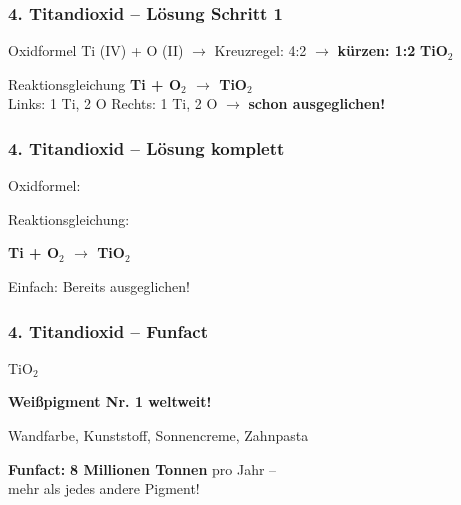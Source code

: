 \documentclass[aspectratio=169, 12pt]{beamer}
\newcommand{\lsg}[1]{\textcolor{loesung}{\textbf{#1}}}
\begin{document}
\begin{frame}
\frametitle{4. Titandioxid – Lösung Schritt 1}
\begin{block}{Oxidformel}
Ti (IV) + O (II) $\rightarrow$ Kreuzregel: 4:2 $\rightarrow$ \textbf{kürzen: 1:2} \hfill \lsg{TiO$_2$}
\end{block}
\vspace{0.3cm}
\begin{block}{Reaktionsgleichung}
\lsg{Ti + O$_2$ $\rightarrow$ TiO$_2$}\\[0.3cm]
Links: 1 Ti, 2 O \quad Rechts: 1 Ti, 2 O \quad $\rightarrow$ \textbf{schon ausgeglichen!}
\end{block}
\end{frame}

\begin{frame}
\frametitle{4. Titandioxid – Lösung komplett}
\begin{center}
\vspace{0.5cm}
{\large Oxidformel:} \quad {\Huge \lsg{TiO$_2$}}
\vspace{1cm}

{\large Reaktionsgleichung:}
\vspace{0.5cm}

{\Huge \lsg{Ti + O$_2$ $\rightarrow$ TiO$_2$}}
\vspace{0.5cm}

{\small Einfach: Bereits ausgeglichen! \checkmark}
\end{center}
\end{frame}

\begin{frame}
\frametitle{4. Titandioxid – Funfact}
\begin{center}
\vspace{0.3cm}
{\Huge \textcolor{chemie}{TiO$_2$}}
\vspace{0.8cm}

{\Large\textbf{Weißpigment Nr. 1 weltweit!}}
\vspace{0.5cm}

Wandfarbe, Kunststoff, Sonnencreme, Zahnpasta
\vspace{0.8cm}

\textcolor{akzent}{\textbf{Funfact:}} \textbf{8 Millionen Tonnen} pro Jahr –\\
mehr als jedes andere Pigment!
\end{center}
\end{frame}

\end{document}
